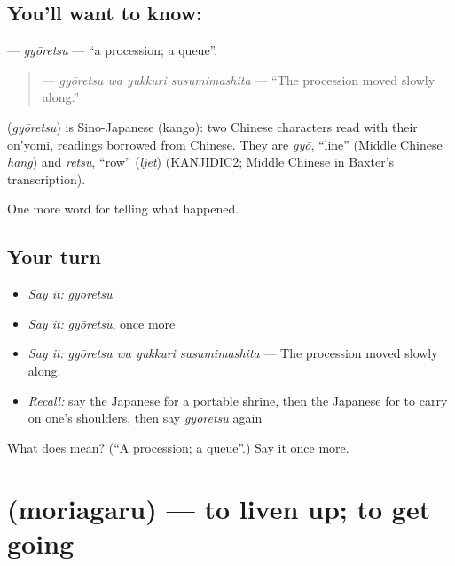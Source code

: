 \subsection*{You'll want to know: }
\textbf{} — \emph{gyōretsu} — \textquotedblleft{}a procession; a queue\textquotedblright{}.

\begin{quote}
\textbf{  } — \emph{gyōretsu wa yukkuri susumimashita} — \textquotedblleft{}The procession moved slowly along.\textquotedblright{}
\end{quote}

\begin{cousinweb}
\textbf{} (\emph{gyōretsu}) is Sino-Japanese (kango): two Chinese characters read with their on'yomi, readings borrowed from Chinese. They are \emph{gyō}, \textquotedblleft{}line\textquotedblright{} (Middle Chinese \emph{hang}) and \emph{retsu}, \textquotedblleft{}row\textquotedblright{} (\emph{ljet}) (KANJIDIC2; Middle Chinese in Baxter's transcription).
\end{cousinweb}

\begin{grammarlens}[title={What you've built}]
One more word for telling what happened.
\end{grammarlens}

\subsection*{Your turn}
\begin{itemize}
\raggedright
  \item \emph{Say it:} \emph{gyōretsu}
  \item \emph{Say it:} \emph{gyōretsu}, once more
  \item \emph{Say it:} \emph{gyōretsu wa yukkuri susumimashita} — The procession moved slowly along.
  \item \emph{Recall:} say the Japanese for a portable shrine, then the Japanese for to carry on one's shoulders, then say \emph{gyōretsu} again
\end{itemize}

\begin{tcolorbox}[breakable,colback=teal!4,colframe=teal!35!black,title={Before you move on}]
What does  mean? (\textquotedblleft{}A procession; a queue\textquotedblright{}.) Say it once more.
\end{tcolorbox}
\section[\texorpdfstring{\ja{もりあがる} (moriagaru)}{もりあがる (moriagaru)}]{ (moriagaru) — to liven up; to get going}

